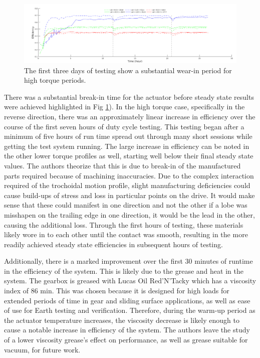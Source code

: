 \begin{figure}[h]
   \centering
   \includegraphics[width=\linewidth]{fig/burn_in}
   \caption{The first three days of testing show a substantial wear-in period for high torque periods.}
   \label{fig:break_in}
\end{figure}

There was a substantial break-in time for the actuator before steady state results were achieved highlighted in Fig \ref{fig:break_in}).
In the high torque case, specifically in the reverse direction, there was an approximately linear increase in efficiency over the course of the first seven hours of duty cycle testing.
This testing began after a minimum of five hours of run time spread out through many short sessions while getting the test system running.
The large increase in efficiency can be noted in the other lower torque profiles as well, starting well below their final steady state values.
The authors theorize that this is due to break-in of the manufactured parts required because of machining inaccuracies.
Due to the complex interaction required of the trochoidal motion profile, slight manufacturing deficiencies could cause build-ups of stress and loss in particular points on the drive.
It would make sense that these could manifest in one direction and not the other if a lobe was misshapen on the trailing edge in one direction, it would be the lead in the other, causing the additional loss.
Through the first hours of testing, these materials likely wore in to each other until the contact was smooth, resulting in the more readily achieved steady state efficiencies in subsequent hours of testing.

Additionally, there is a marked improvement over the first 30 minutes of runtime in the efficiency of the system.
This is likely due to the grease and heat in the system.
The gearbox is greased with Lucas Oil Red'N'Tacky which has a viscosity index of 86 min.
This was chosen because it is designed for high loads for extended periods of time in gear and sliding surface applications, as well as ease of use for Earth testing and verification.
Therefore, during the warm-up period as the actuator temperature increases, the viscosity decrease is likely enough to cause a notable increase in efficiency of the system.
The authors leave the study of a lower viscosity grease's effect on performance, as well as grease suitable for vacuum, for future work.

